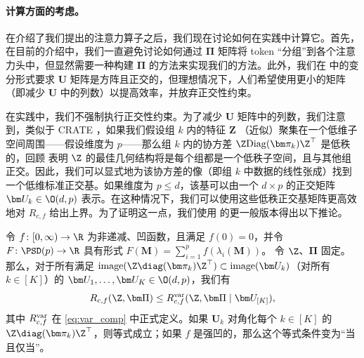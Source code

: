 \documentclass[../../book-main_zh.tex]{subfiles}
\begin{document}
\paragraph{计算方面的考虑。} 在介绍了我们提出的注意力算子之后，我们现在讨论如何在实践中计算它。首先，在目前的介绍中，我们一直避免讨论如何通过 $\bm\Pi$ 矩阵将 token “分组”到各个注意力头中，但显然需要一种构建 $\bm\Pi$ 的方法来实现我们的方法。此外，我们在  中的变分形式要求 $\bm U$ 矩阵是方阵且正交的，但理想情况下，人们希望使用更小的矩阵（即减少 $\bm U$ 中的列数）以提高效率，并放弃正交性约束。

在实践中，我们不强制执行正交性约束。为了减少 $\bm U$ 矩阵中的列数，我们注意到，类似于 CRATE \citep{yu2023white}，如果我们假设组 \(k\) 内的特征 $\bm Z$ （近似）聚集在一个低维子空间周围——假设维度为 \(p\)——那么组 \(k\) 内的协方差 \(\Z\mathrm{Diag}(\bm
\pi_{k})\Z^{\top}\) 是低秩的，回顾 \cite{yu2020learning} 表明 $\Z$ 的最佳几何结构将是每个组都是一个低秩子空间，且与其他组正交。因此，我们可以显式地为该协方差的像（即组 \(k\) 中数据的线性张成）找到一个低维标准正交基。如果维度为 $p \leq d$，该基可以由一个 $d\times p$ 的正交矩阵 $\bm U_k \in \O(d,
p)$ 表示。在这种情况下，我们可以使用这些低秩正交基矩阵更高效地对 \(R_{c,f}\) 给出上界。为了证明这一点，我们使用  的更一般版本得出以下推论。
\begin{corollary}\label{cor:var_concave_logdet}
    令 \(f \colon [0, \infty) \to \R\) 为非递减、凹函数，且满足 \(f(0) = 0\)，并令 \(F \colon \PSD(p) \to \R\) 具有形式 \(F(\bm M) = \sum_{i = 1}^{p}f(\lambda_{i}(\bm M))\)。
    令 \(\Z\)、\(\bm \Pi\) 固定。那么，对于所有满足 \(\mathrm{image}(\Z\diag(\bm \pi_{k})\Z^{\top}) \subset
    \mathrm{image}(\bm U_{k})\)（对所有 \(k \in [K]\)）的 \(\bm U_{1},
    \dots, \bm U_{K} \in \O(d, p)\)，我们有
    \begin{equation}
        R_{c, f}(\Z, \bm\Pi) \leq R_{c, f}^{\rm var}(\Z, \bm\Pi \mid
        \bm U_{[K]}),
    \end{equation}
    其中 \(R_{c, f}^{\rm var}\) 在 \eqref{eq:var_comp} 中正式定义。如果 \(\bm U_{k}\) 对角化每个 \(k \in [K]\) 的 \(\Z\diag(\bm \pi_{k})\Z^{\top}\)，则等式成立；如果 \(f\) 是强凹的，那么这个等式条件变为“当且仅当”。
\end{corollary}
\end{document}
